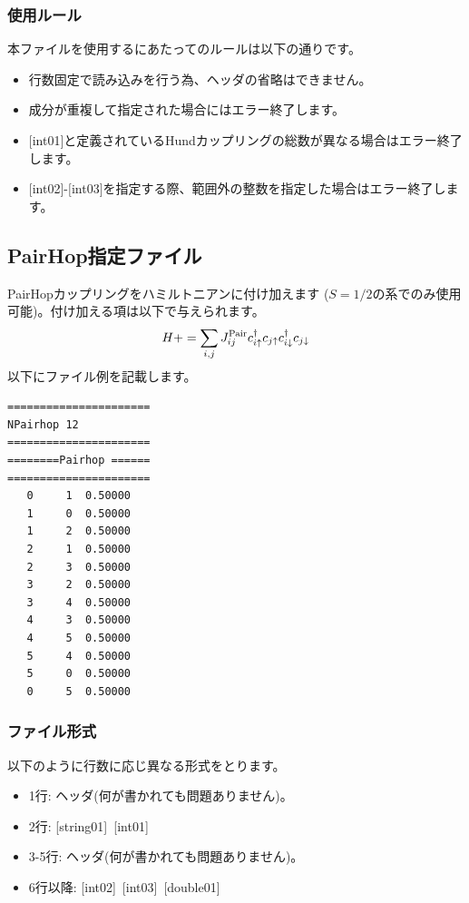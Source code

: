 \subsubsection{使用ルール}
本ファイルを使用するにあたってのルールは以下の通りです。
\begin{itemize}
\item 行数固定で読み込みを行う為、ヘッダの省略はできません。
\item 成分が重複して指定された場合にはエラー終了します。
\item $[$int01$]$と定義されているHundカップリングの総数が異なる場合はエラー終了します。
\item $[$int02$]$-$[$int03$]$を指定する際、範囲外の整数を指定した場合はエラー終了します。
\end{itemize}

\newpage
\subsection{PairHop指定ファイル}
PairHopカップリングをハミルトニアンに付け加えます{ ($S=1/2$の系でのみ使用可能)}。付け加える項は以下で与えられます。
\begin{equation}
H+=\sum_{i,j}J_{ij}^{\rm Pair} c_ {i \uparrow}^{\dag}c_{j\uparrow}c_{i \downarrow}^{\dag}c_{j  \downarrow}
\end{equation}
以下にファイル例を記載します。

\begin{minipage}{12.5cm}
\begin{screen}
\begin{verbatim}
====================== 
NPairhop 12  
====================== 
========Pairhop ====== 
====================== 
   0     1  0.50000
   1     0  0.50000  
   1     2  0.50000
   2     1  0.50000
   2     3  0.50000
   3     2  0.50000
   3     4  0.50000
   4     3  0.50000
   4     5  0.50000
   5     4  0.50000
   5     0  0.50000
   0     5  0.50000
\end{verbatim}
\end{screen}
\end{minipage}

\subsubsection{ファイル形式}
以下のように行数に応じ異なる形式をとります。
 \begin{itemize}
   \item  1行:  ヘッダ(何が書かれても問題ありません)。
   \item  2行:   [string01]~[int01]
   \item  3-5行:  ヘッダ(何が書かれても問題ありません)。
   \item  6行以降:
   [int02]~[int03]~[double01] 
  \end{itemize}
